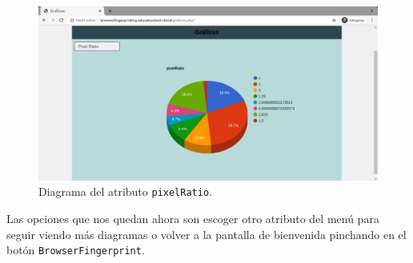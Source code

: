 \begin{figure}[H]
	\centering
	\includegraphics[width=1\textwidth]{Images/pixelRatioChart.png}
	\caption{Diagrama del atributo \texttt{pixelRatio}.}
	\label{fig:pixelRatioChart}
\end{figure}

Las opciones que nos quedan ahora son escoger otro atributo del menú para seguir viendo más diagramas o volver a la pantalla de bienvenida pinchando en el botón \texttt{BrowserFingerprint}.
